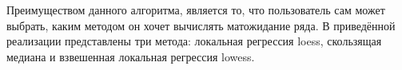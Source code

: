 \documentclass[specialist,
               substylefile = spbu.rtx,
               subf,href,colorlinks=true, 12pt]{disser}
\newtheorem*{notice*}{Замечание}
\begin{document}

\normalsize{Преимуществом данного алгоритма, является то, что пользователь сам может выбрать, каким методом он хочет вычислять матожидание ряда. В приведённой реализации представлены три метода: локальная регрессия loess, скользящая медиана и взвешенная локальная регрессия lowess.}

%
%
%
%
%
%
\end{document}
